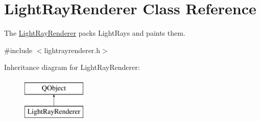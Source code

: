 \hypertarget{class_light_ray_renderer}{\section{Light\+Ray\+Renderer Class Reference}
\label{class_light_ray_renderer}
}


The \hyperlink{class_light_ray_renderer}{Light\+Ray\+Renderer} packs Light\+Rays and paints them.  




{\ttfamily \#include $<$lightrayrenderer.\+h$>$}

Inheritance diagram for Light\+Ray\+Renderer\+:\begin{figure}[H]
\begin{center}
\leavevmode
\includegraphics[height=2.000000cm]{class_light_ray_renderer}
\end{center}
\end{figure}
